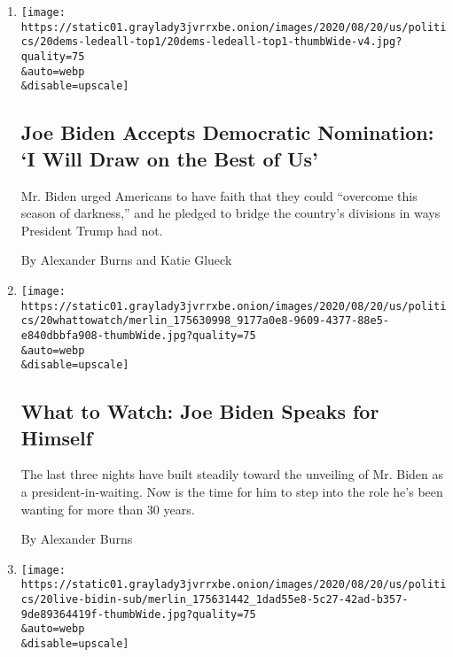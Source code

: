 \begin{enumerate}
\def\labelenumi{\arabic{enumi}.}
\item
  \href{/2020/08/20/us/politics/Joe-Biden-accepts-democratic-nomination.html}{}

  \texttt{[image: https://static01.graylady3jvrrxbe.onion/images/2020/08/20/us/politics/20dems-ledeall-top1/20dems-ledeall-top1-thumbWide-v4.jpg?quality=75\\\&auto=webp\\\&disable=upscale]}

  \hypertarget{joe-biden-accepts-democratic-nomination-i-will-draw-on-the-best-of-us}{%
  \subsection{Joe Biden Accepts Democratic Nomination: `I Will Draw on
  the Best of
  Us'}\label{joe-biden-accepts-democratic-nomination-i-will-draw-on-the-best-of-us}}

  Mr. Biden urged Americans to have faith that they could ``overcome
  this season of darkness,'' and he pledged to bridge the country's
  divisions in ways President Trump had not.

  By Alexander Burns and Katie Glueck
\item
  \href{/2020/08/20/us/politics/democratic-national-convention-guide.html}{}

  \texttt{[image: https://static01.graylady3jvrrxbe.onion/images/2020/08/20/us/politics/20whattowatch/merlin\_175630998\_9177a0e8-9609-4377-88e5-e840dbbfa908-thumbWide.jpg?quality=75\\\&auto=webp\\\&disable=upscale]}

  \hypertarget{what-to-watch-joe-biden-speaks-for-himself}{%
  \subsection{What to Watch: Joe Biden Speaks for
  Himself}\label{what-to-watch-joe-biden-speaks-for-himself}}

  The last three nights have built steadily toward the unveiling of Mr.
  Biden as a president-in-waiting. Now is the time for him to step into
  the role he's been wanting for more than 30 years.

  By Alexander Burns
\item
  \href{/2020/08/20/us/elections/democrats-have-done-the-setup-work-now-biden-must-stand-on-his-own.html}{}

  \texttt{[image: https://static01.graylady3jvrrxbe.onion/images/2020/08/20/us/politics/20live-bidin-sub/merlin\_175631442\_1dad55e8-5c27-42ad-b357-9de89364419f-thumbWide.jpg?quality=75\\\&auto=webp\\\&disable=upscale]}


\end{enumerate}
